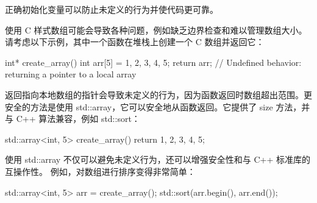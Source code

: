 正确初始化变量可以防止未定义的行为并使代码更可靠。


使用 C 样式数组可能会导致各种问题，例如缺乏边界检查和难以管理数组大小。请考虑以下示例，其中一个函数在堆栈上创建一个 C 数组并返回它：

\begin{cpp}
int* create_array() {
    int arr[5] = {1, 2, 3, 4, 5};
    return arr; // Undefined behavior: returning a pointer to a local array
}
\end{cpp}

返回指向本地数组的指针会导致未定义的行为，因为函数返回时数组超出范围。更安全的方法是使用 std::array，它可以安全地从函数返回。它提供了 size 方法，并与 C++ 算法兼容，例如 std::sort：

\begin{cpp}
std::array<int, 5> create_array() {
    return {1, 2, 3, 4, 5};
}
\end{cpp}

使用 std::array 不仅可以避免未定义行为，还可以增强安全性和与 C++ 标准库的互操作性。
例如，对数组进行排序变得非常简单：

\begin{cpp}
std::array<int, 5> arr = create_array();
std::sort(arr.begin(), arr.end());
\end{cpp}
